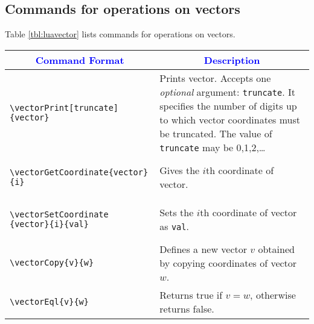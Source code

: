 \documentclass{article}
\begin{document}
\subsection{Commands for operations on vectors}
Table \ref{tbl:luavector} lists commands for operations on vectors. 
\begin{longtable}{m{7cm}m{8.2cm}}
\toprule
\multicolumn{1}{c}{\textcolor{blue}{Command Format}} & \multicolumn{1}{c}{\textcolor{blue}{Description}} \\
\toprule
\begin{lstlisting}
\vectorPrint[truncate]{vector}
\end{lstlisting} & Prints vector. Accepts one \emph{optional} argument: \verb|truncate|. It specifies the number of digits  up to which vector coordinates must be truncated. The value of \verb|truncate|  may be 0,1,2,\ldots\\
\midrule
\begin{lstlisting}
\vectorGetCoordinate{vector}{i}
\end{lstlisting}
&
Gives  the \(i\)th coordinate of vector. \\
\midrule
 \begin{lstlisting}
\vectorSetCoordinate
{vector}{i}{val}
\end{lstlisting}
&
Sets  the \(i\)th coordinate of vector as \verb|val|. \\
\midrule
\begin{lstlisting}
\vectorCopy{v}{w}
\end{lstlisting}&
Defines a new vector \(v\) obtained by copying coordinates of vector \(w\). \\
\midrule

\begin{lstlisting}
\vectorEql{v}{w}
\end{lstlisting}&
Returns true if \(v = w\), otherwise returns false. \\
\midrule


\end{longtable}
\end{document}
